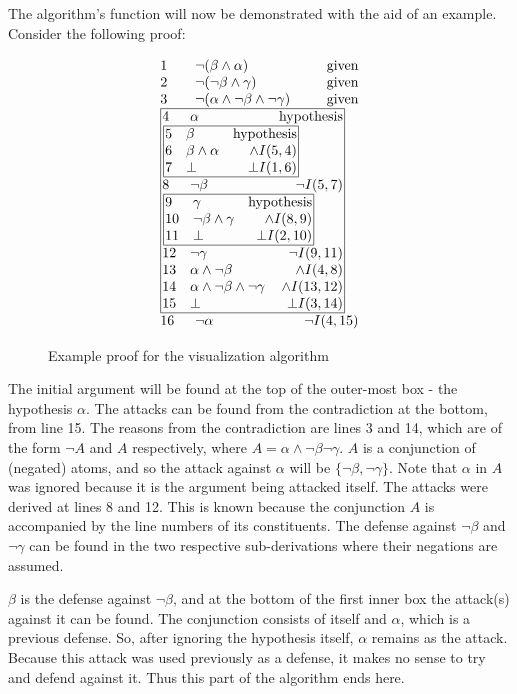 \documentclass[11pt,twoside,a4paper]{report}
\begin{document}
The algorithm's function will now be demonstrated with the aid of an example. Consider 
the following proof:

\begin{figure}
\[\vbox{\offinterlineskip\halign{
&\tabskip=1.5em#\strut&$#$\hfil\tabskip=1em&\hfil$#$\tabskip=0em\cr
%
1&\neg(\beta\wedge\alpha)&\mbox{given}\cr
2&\neg(\neg\beta\wedge\gamma)&\mbox{given}\cr
3&\neg(\alpha\wedge\neg\beta\wedge\neg\gamma)&\mbox{given}\cr
%
\multispan3\vbox{\halign{
\vrule#&&\hskip.1em\tabskip=1em#\strut&$#$\hfil\tabskip=1em&\hfil$#$\hskip0.1em\tabskip=0em&\vrule#\cr
\noalign{\hrule}
%
&4&\alpha&\mbox{hypothesis}&\cr
%
&\multispan3\,\vbox{\halign{
\vrule#&&\hskip.1em\tabskip=1em#\strut&$#$\hfil\tabskip=1em&\hfil$#$\hskip0.1em\tabskip=0em&\vrule#\cr
\noalign{\hrule}
%
&5&\beta&\mbox{hypothesis}&\cr
&6&\beta\wedge\alpha&\wedge I(5,4)&\cr
&7&\bot&\bot I(1,6)&\cr
%
\noalign{\hrule}}}\,&\cr
%
&8&\neg\beta&\neg I(5,7)&\cr
%
&\multispan3\,\vbox{\halign{
\vrule#&&\hskip.1em\tabskip=1em#\strut&$#$\hfil\tabskip=1em&\hfil$#$\hskip0.1em\tabskip=0em&\vrule#\cr
\noalign{\hrule}
%
&9&\gamma&\mbox{hypothesis}&\cr
&10&\neg\beta\wedge\gamma&\wedge I(8,9)&\cr
&11&\bot&\bot I(2,10)&\cr
%
\noalign{\hrule}}}\,&\cr
%
&12&\neg\gamma&\neg I(9,11)&\cr
&13&\alpha\wedge\neg\beta&\wedge I(4,8)&\cr
&14&\alpha\wedge\neg\beta\wedge\neg\gamma&\wedge I(13,12)&\cr
&15&\bot&\bot I(3,14)&\cr
%
\noalign{\hrule}}}\,\cr
%
16&\neg\alpha&\neg I(4,15)\cr
}}\]
\caption{Example proof for the visualization algorithm\label{fig:vizexproof}}
\end{figure}

The initial argument will be found at the top of the outer-most box - the hypothesis $\alpha$. The attacks can be found from the contradiction at the bottom, from line 15. The reasons from the contradiction are lines 3 and 14, which are of the form $\neg A$ and $A$ respectively, where $A = \alpha\wedge\neg\beta\neg\gamma$. $A$ is a conjunction of (negated) atoms, and so the attack against $\alpha$ will be $\{\neg\beta, \neg\gamma\}$. Note that $\alpha$ in $A$ was ignored because it is the argument being attacked itself. The attacks were derived at lines 8 and 12. This is known because the conjunction $A$ is accompanied by the line numbers of its constituents. The defense against $\neg\beta$ and $\neg\gamma$ can be found in the two respective sub-derivations where their negations are assumed. 

$\beta$ is the defense against $\neg\beta$, and at the bottom of the first inner box the attack(s) against it can be found. The conjunction consists of itself and $\alpha$, which is a previous defense. So, after ignoring the hypothesis itself, $\alpha$ remains as the attack. Because this attack was used previously as a defense, it makes no sense to try and defend against it. Thus this part of the algorithm ends here.
\end{document}

